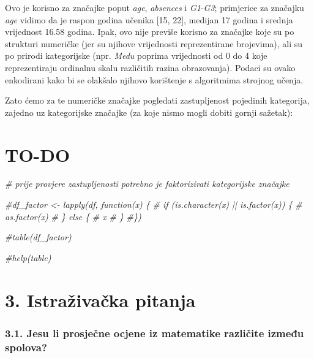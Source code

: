 \documentclass[
]{article}
\newenvironment{Shaded}{\begin{snugshade}}{\end{snugshade}}
\newcommand{\CommentTok}[1]{\textcolor[rgb]{0.56,0.35,0.01}{\textit{#1}}}
\begin{document}
Ovo je korisno za značajke poput \emph{age}, \emph{absences} i
\emph{G1}-\emph{G3}; primjerice za značajku \emph{age} vidimo da je
raspon godina učenika {[}15, 22{]}, medijan 17 godina i srednja
vrijednost 16.58 godina. Ipak, ovo nije previše korisno za značajke koje
su po strukturi numeričke (jer su njihove vrijednosti reprezentirane
brojevima), ali su po prirodi kategorijske (npr. \emph{Medu} poprima
vrijednosti od 0 do 4 koje reprezentiraju ordinalnu skalu različitih
razina obrazovanja). Podaci su ovako enkodirani kako bi se olakšalo
njihovo korištenje s algoritmima strojnog učenja.

Zato ćemo za te numeričke značajke pogledati zastupljenost pojedinih
kategorija, zajedno uz kategorijske značajke (za koje nismo mogli dobiti
gornji sažetak):

\hypertarget{to-do}{%
\section{TO-DO}\label{to-do}}

\begin{Shaded}
\begin{Highlighting}[]
\CommentTok{\# prije provjere zastupljenosti potrebno je faktorizirati kategorijske značajke}

\CommentTok{\#df\_factor \textless{}{-} lapply(df, function(x) \{}
\CommentTok{\#  if (is.character(x) || is.factor(x)) \{}
\CommentTok{\#    as.factor(x)}
\CommentTok{\#  \} else \{}
\CommentTok{\#    x}
\CommentTok{\#  \}}
\CommentTok{\#\})}

\CommentTok{\#table(df\_factor)}
\end{Highlighting}
\end{Shaded}

\begin{Shaded}
\begin{Highlighting}[]
\CommentTok{\#help(table)}
\end{Highlighting}
\end{Shaded}

\hypertarget{istraux17eivaux10dka-pitanja}{%
\section{3. Istraživačka pitanja}\label{istraux17eivaux10dka-pitanja}}

\hypertarget{jesu-li-prosjeux10dne-ocjene-iz-matematike-razliux10dite-izmeux111u-spolova}{%
\subsubsection{3.1. Jesu li prosječne ocjene iz matematike različite
između
spolova?}\label{jesu-li-prosjeux10dne-ocjene-iz-matematike-razliux10dite-izmeux111u-spolova}}
\end{document}
